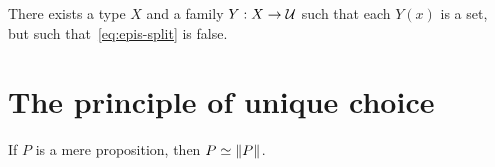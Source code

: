 \documentclass[hott-all.tex]{subfiles}
\begin{document}
\begin{lem}
  There exists a type $X$ and a family $Y:X\to \mathcal{U}$ such that each $Y(x)$ is a set, but such that~\eqref{eq:epis-split} is false.
\end{lem}

%
%
%

\section{The principle of unique choice}

%

\begin{lem}
  If $P$ is a mere proposition, then $P \simeq \mathopen{}\left\Vert P\right\Vert_{}\mathclose{}$.
\end{lem}
%
%
\end{document}

